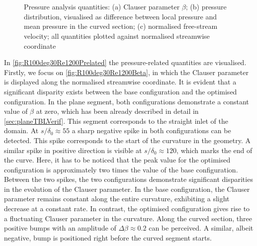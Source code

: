 \begin{figure}[h!]
\centering\begin{subfigure}[t]{0.495\textwidth}
    \centering
    \subcaption{}
    
    \label{fig:R100deg30Re1200Beta}
\end{subfigure}
\hfill
\begin{subfigure}[t]{0.495\textwidth}
    \subcaption{}
    \centering
    
    \label{fig:R100deg30Re1200p}
\end{subfigure}
\\[-20pt]
\begin{subfigure}[t]{0.495\textwidth}
    \centering
    \subcaption{}
    
    \label{fig:R100deg30Re1200Uinf}
\end{subfigure}
\\[-15pt]
\caption{Pressure analysis quantities: (a) Clauser parameter $\beta$; (b) pressure distribution, visualised as difference between local pressure and mean pressure in the curved section; (c) normalised free-stream velocity; all quantities plotted against normalised streamwise coordinate}
\label{fig:R100deg30Re1200Prelated}
\end{figure}

In \autoref{fig:R100deg30Re1200Prelated} the pressure-related quantities are visualised.
Firstly, we focus on \autoref{fig:R100deg30Re1200Beta}, in which the Clauser parameter is displayed along the normalised streamwise coordinate.
It is evident that a significant disparity exists between the base configuration and the optimised configuration.
In the plane segment, both configurations demonstrate a constant value of $\beta$ at zero, which has been already described in detail in \autoref{sec:planeTBLVerif}.
This segment corresponds to the straight inlet of the domain.
At $s/\delta_0 \approx 55$ a sharp negative spike in both configurations can be detected.
This spike corresponds to the start of the curvature in the geometry. 
A similar spike in positive direction is visible at $s/\delta_0 \approx 120$, which marks the end of the curve.
Here, it has to be noticed that the peak value for the optimised configuration is approximately two times the value of the base configuration.
Between the two spikes, the two configurations demonstrate significant disparities in the evolution of the Clauser parameter.
In the base configuration, the Clauser parameter remains constant along the entire curvature, exhibiting a slight decrease at a constant rate. 
In contrast, the optimised configuration gives rise to a fluctuating Clauser parameter in the curvature.
Along the curved section, three positive bumps with an amplitude of $\Delta\beta \approx 0.2$ can be perceived.
A similar, albeit negative, bump is positioned right before the curved segment starts.

